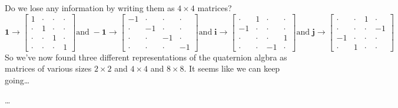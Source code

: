 \documentclass[12pt]{article}
\newcommand{\one}{\mathbf{1}}
\newcommand{\ii}{\mathbf{i}}
\newcommand{\jj}{\mathbf{j}}
\begin{document}
Do we lose any information by writing them as  $4 \times 4$ matrices?
$$\one \to \left[ \begin{array}{cccc} 1 & \cdot & \cdot & \cdot \\ 
\cdot & 1 & \cdot  & \cdot \\ 
\cdot & \cdot & 1 & \cdot \\
\cdot & \cdot & \cdot & 1  \end{array} \right] \text{and}\; -\one \to \left[ \begin{array}{cccc} -1 & \cdot & \cdot & \cdot \\ 
\cdot & -1 & \cdot  & \cdot \\ 
\cdot & \cdot & -1 & \cdot \\
\cdot & \cdot & \cdot & -1  \end{array} \right] \text{and}\;
\ii \to \left[
\begin{array}{cccc} \cdot & 1 & \cdot & \cdot \\ 
-1 & \cdot & \cdot & \cdot \\ 
\cdot & \cdot & \cdot & 1 \\
\cdot & \cdot & -1 & \cdot \end{array} \right] \text{and}\;
\jj \to \left[ \begin{array}{cccc} \cdot & \cdot & 1 & \cdot \\
\cdot & \cdot & \cdot & -1 \\ 
-1 & \cdot & \cdot & \cdot  \\ 
\cdot & 1 & \cdot & \cdot \end{array}\right] $$
So we've now found three different representations of the quaternion algbra as matrices of various sizes $2 \times 2$ and $4 \times 4$ and $8 \times 8$.  It seems like we can keep going\dots 
\begin{thebibliography}{}

\item \dots

\end{thebibliography}
\end{document}
